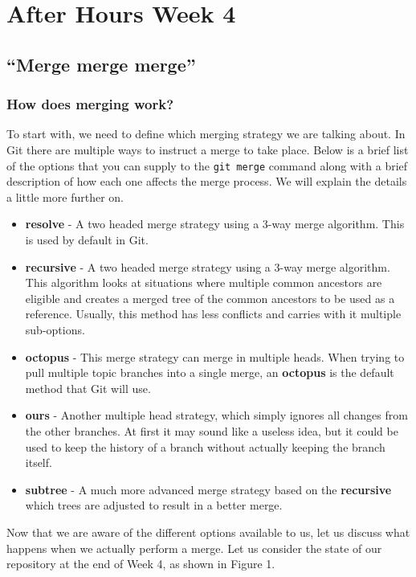 \chapter{After Hours Week 4}
\section{``Merge merge merge''}
\subsection{How does merging work?}
To start with, we need to define which merging strategy we are talking about.
In Git there are multiple ways to instruct a merge to take place.
Below is a brief list of the options that you can supply to the \texttt{git merge} command along with a brief description of how each one affects the merge process.
We will explain the details a little more further on.

\begin{itemize}
\item\textbf{resolve} - A two headed merge strategy using a 3-way merge algorithm.
This is used by default in Git.
\item\textbf{recursive} - A two headed merge strategy using a 3-way merge algorithm.
This algorithm looks at situations where multiple common ancestors are eligible and creates a merged tree of the common ancestors to be used as a reference.
Usually, this method has less conflicts and carries with it multiple sub-options.
\item\textbf{octopus} - This merge strategy can merge in multiple heads.
When trying to pull multiple topic branches into a single merge, an \textbf{octopus} is the default method that Git will use.
\item\textbf{ours} - Another multiple head strategy, which simply ignores all changes from the other branches.
At first it may sound like a useless idea, but it could be used to keep the history of a branch without actually keeping the branch itself.
\item\textbf{subtree} - A much more advanced merge strategy based on the \textbf{recursive} which trees are adjusted to result in a better merge.
\end{itemize}

Now that we are aware of the different options available to us, let us discuss what happens when we actually perform a merge.
Let us consider the state of our repository at the end of Week 4, as shown in Figure 1.

